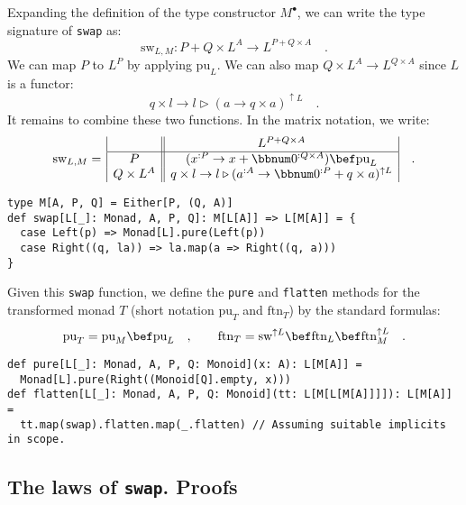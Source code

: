 Expanding the definition of the type constructor $M^{\bullet}$, we
can write the type signature of \lstinline!swap! as: 
\[
\text{sw}_{L,M}:P+Q\times L^{A}\rightarrow L^{P+Q\times A}\quad.
\]
We can map $P$ to $L^{P}$ by applying $\text{pu}_{L}$. We can also
map $Q\times L^{A}\rightarrow L^{Q\times A}$ since $L$ is a functor:
\[
q\times l\rightarrow l\triangleright\left(a\rightarrow q\times a\right)^{\uparrow L}\quad.
\]
 It remains to combine these two functions. In the matrix notation,
we write:
\begin{equation}
\text{sw}_{L,M}=\,\begin{array}{|c||c|}
 & L^{P+Q\times A}\\
\hline P & (x^{:P}\rightarrow x+\bbnum 0^{:Q\times A})\bef\text{pu}_{L}\\
Q\times L^{A} & q\times l\rightarrow l\triangleright(a^{:A}\rightarrow\bbnum 0^{:P}+q\times a)^{\uparrow L}
\end{array}\quad.\label{eq:single-valued-monad-def-of-swap}
\end{equation}
\begin{lstlisting}
type M[A, P, Q] = Either[P, (Q, A)]
def swap[L[_]: Monad, A, P, Q]: M[L[A]] => L[M[A]] = {
  case Left(p) => Monad[L].pure(Left(p))
  case Right((q, la)) => la.map(a => Right((q, a)))
}
\end{lstlisting}

Given this \lstinline!swap! function, we define the \lstinline!pure!
and \lstinline!flatten! methods for the transformed monad $T$ (short
notation $\text{pu}_{T}$ and $\text{ftn}_{T}$) by the standard formulas:
\[
\text{pu}_{T}=\text{pu}_{M}\bef\text{pu}_{L}\quad,\quad\quad\text{ftn}_{T}=\text{sw}^{\uparrow L}\bef\text{ftn}_{L}\bef\text{ftn}_{M}^{\uparrow L}\quad.
\]
\begin{lstlisting}
def pure[L[_]: Monad, A, P, Q: Monoid](x: A): L[M[A]] =
  Monad[L].pure(Right((Monoid[Q].empty, x)))
def flatten[L[_]: Monad, A, P, Q: Monoid](tt: L[M[L[M[A]]]]): L[M[A]] =
  tt.map(swap).flatten.map(_.flatten) // Assuming suitable implicits in scope.
\end{lstlisting}


\subsection{The laws of \texttt{swap}. Proofs}

